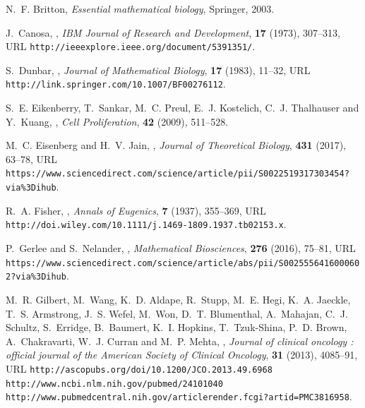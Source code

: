 \documentclass{aims}
\numberwithin{equation}{section}
\begin{document}
%
%
\providecommand{\href}[2]{#2}
\providecommand{\arxiv}[1]{\href{http://arxiv.org/abs/#1}{arXiv:#1}}
\providecommand{\url}[1]{\texttt{#1}}
\providecommand{\urlprefix}{URL }
\begin{thebibliography}{10}

\newblock N.~F. Britton,
\newblock \emph{{Essential mathematical biology}},
\newblock Springer, 2003.

\newblock J.~Canosa,
,
\newblock \emph{IBM Journal of Research and Development}, \textbf{17} (1973),
  307--313,
\newblock \urlprefix\url{http://ieeexplore.ieee.org/document/5391351/}.

\newblock S.~Dunbar,
,
\newblock \emph{Journal of Mathematical Biology}, \textbf{17} (1983), 11--32,
\newblock \urlprefix\url{http://link.springer.com/10.1007/BF00276112}.

\newblock S.~E. Eikenberry, T.~Sankar, M.~C. Preul, E.~J. Kostelich, C.~J.
  Thalhauser and Y.~Kuang,
,
\newblock \emph{Cell Proliferation}, \textbf{42} (2009), 511--528.

\newblock M.~C. Eisenberg and H.~V. Jain,
,
\newblock \emph{Journal of Theoretical Biology}, \textbf{431} (2017), 63--78,
\newblock
  \urlprefix\url{https://www.sciencedirect.com/science/article/pii/S0022519317303454?via{\%}3Dihub}.

\newblock R.~A. Fisher,
,
\newblock \emph{Annals of Eugenics}, \textbf{7} (1937), 355--369,
\newblock
  \urlprefix\url{http://doi.wiley.com/10.1111/j.1469-1809.1937.tb02153.x}.

\newblock P.~Gerlee and S.~Nelander,
,
\newblock \emph{Mathematical Biosciences}, \textbf{276} (2016), 75--81,
\newblock
  \urlprefix\url{https://www.sciencedirect.com/science/article/abs/pii/S0025556416000602?via{\%}3Dihub}.

\newblock M.~R. Gilbert, M.~Wang, K.~D. Aldape, R.~Stupp, M.~E. Hegi, K.~A.
  Jaeckle, T.~S. Armstrong, J.~S. Wefel, M.~Won, D.~T. Blumenthal, A.~Mahajan,
  C.~J. Schultz, S.~Erridge, B.~Baumert, K.~I. Hopkins, T.~Tzuk-Shina, P.~D.
  Brown, A.~Chakravarti, W.~J. Curran and M.~P. Mehta,
,
\newblock \emph{Journal of clinical oncology : official journal of the American
  Society of Clinical Oncology}, \textbf{31} (2013), 4085--91,
\newblock \urlprefix\url{http://ascopubs.org/doi/10.1200/JCO.2013.49.6968
  http://www.ncbi.nlm.nih.gov/pubmed/24101040
  http://www.pubmedcentral.nih.gov/articlerender.fcgi?artid=PMC3816958}.


\end{thebibliography}
\end{document}
